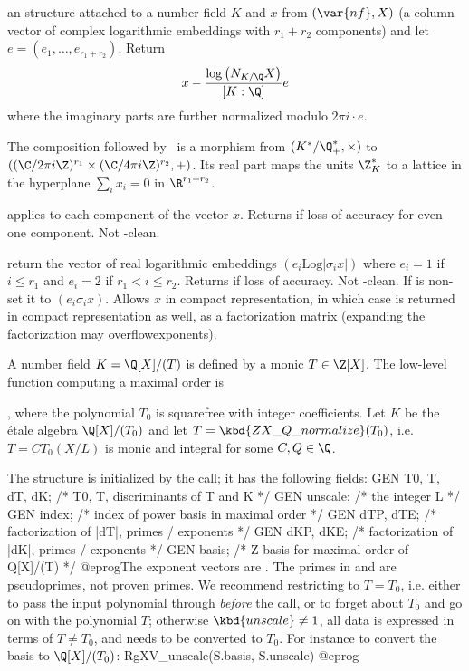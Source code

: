  an  structure
attached to a number field $K$ and $x$ from $(\var{nf}, X)$
(a column vector of complex logarithmic embeddings with $r_1 + r_2$
components) and let $e = (e_1,\dots,e_{r_1+r_2})$.
Return
$$ x - \dfrac{\log \big(N_{K/\Q} X\big)}{[K:\Q]} e $$
where the imaginary parts are further normalized modulo $2\pi i \cdot e$.

The composition  followed by~ is a
morphism from $(K^*/\Q_+^*, \times)$ to
$((\C/2\pi i\Z)^{r_1} \times (\C/4\pi i\Z)^{r_2}, +)$.
Its real part maps the units $\Z_K^*$ to a lattice in the hyperplane
$\sum_i x_i = 0$ in $\R^{r_1+r_2}$.

 applies 
to each component of the vector $x$. Returns  if loss of
accuracy for even one component. Not -clean.

return the vector of real logarithmic embeddings $(e_i \text{Log}|\sigma_i x|)$
where $e_i = 1$ if $i \leq r_1$ and $e_i = 2$ if $r_1 < i \leq r_2$. Returns
 if loss of accuracy. Not -clean. If 
is non- set it to $(e_i \sigma_i x)$.
Allows $x$ in compact representation, in which case  is returned
in compact representation as well, as a factorization matrix (expanding the
factorization may overflowexponents).


A number field $K = \Q[X]/(T)$ is defined by a monic $T\in\Z[X]$. The
low-level function computing a maximal order is

, where
the polynomial $T_0$ is squarefree with integer coefficients. Let $K$ be the
\'etale algebra $\Q[X]/(T_0)$ and let $T = \kbd{ZX\_Q\_normalize}(T_0)$,
i.e. $T = C T_0(X/L)$ is monic and integral for some $C,Q\in \Q$.

The structure  is initialized by the call; it has the
following fields:
\bprog
  GEN T0, T, dT, dK; /* T0, T, discriminants of T and K */
  GEN unscale; /* the integer L */
  GEN index; /* index of power basis in maximal order */
  GEN dTP, dTE; /* factorization of |dT|, primes / exponents */
  GEN dKP, dKE; /* factorization of |dK|, primes / exponents */
  GEN basis; /* Z-basis for maximal order of Q[X]/(T) */
@eprog\noindent The exponent vectors are . The primes
in  and  are pseudoprimes, not proven primes. We recommend
restricting to $T = T_0$, i.e. either to pass the input polynomial through
 \emph{before} the call, or to forget about $T_0$
and go on with the polynomial $T$; otherwise $\kbd{unscale}\neq 1$, all data
is expressed in terms of $T\neq T_0$, and needs to be converted to $T_0$. For
instance to convert the basis to $\Q[X]/(T_0)$:
\bprog
  RgXV_unscale(S.basis, S.unscale)
@eprog

